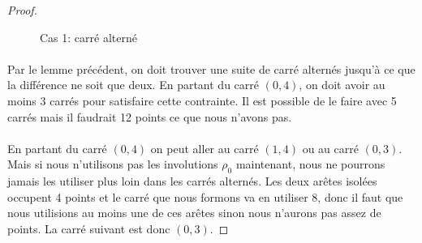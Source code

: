 \begin{proof}
\begin{figure}[H]
\begin{center}
      \caption{Cas 1: carré alterné}
    \end{center}
  \end{figure}

  \paragraph{}
  Par le lemme précédent, on doit trouver une suite de carré alternés jusqu'à ce que la différence ne soit que deux. En partant du carré $(0,4)$, on doit avoir au moins 3 carrés pour satisfaire cette contrainte. Il est possible de le faire avec 5 carrés mais il faudrait 12 points ce que nous n'avons pas.

  \paragraph{}
  En partant du carré $(0,4)$ on peut aller au carré $(1,4)$ ou au carré $(0,3)$. Mais si nous n'utilisons pas les involutions $\rho_0$ maintenant, nous ne pourrons jamais les utiliser plus loin dans les carrés alternés. Les deux arêtes isolées occupent 4 points et le carré que nous formons va en utiliser 8, donc il faut que nous utilisions au moins une de ces arêtes sinon nous n'aurons pas assez de points. La carré suivant est donc $(0,3)$.


\end{proof}

